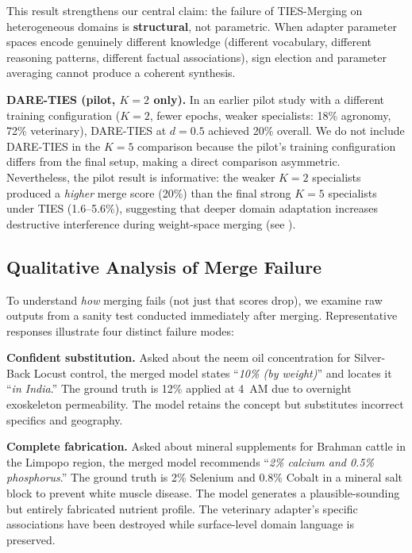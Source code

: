 \documentclass[conference, 10pt]{IEEEtran}
\begin{document}
This result strengthens our central claim: the failure of TIES-Merging
on heterogeneous domains is \textbf{structural}, not parametric.
When adapter parameter spaces encode genuinely different knowledge
(different vocabulary, different reasoning patterns, different factual
associations), sign election and parameter averaging cannot produce a
coherent synthesis.

\textbf{DARE-TIES (pilot, $K=2$ only).}
In an earlier pilot study with a different training configuration
($K=2$, fewer epochs, weaker specialists: 18\% agronomy, 72\%
veterinary), DARE-TIES at $d = 0.5$ achieved 20\% overall.
We do not include DARE-TIES in the $K=5$ comparison because the
pilot's training configuration differs from the final setup,
making a direct comparison asymmetric.
Nevertheless, the pilot result is informative: the weaker $K=2$
specialists produced a \emph{higher} merge score (20\%) than the
final strong $K=5$ specialists under TIES (1.6--5.6\%),
suggesting that deeper domain adaptation increases destructive
interference during weight-space merging (see ).

\subsection{Qualitative Analysis of Merge Failure}
\label{sec:qualitative}

To understand \emph{how} merging fails (not just that scores
drop), we examine raw outputs from a sanity test conducted
immediately after merging.
Representative responses illustrate four distinct failure modes:

\textbf{Confident substitution.}
Asked about the neem oil concentration for Silver-Back Locust control,
the merged model states ``\emph{10\% (by weight)}'' and locates it
``\emph{in India}.''
The ground truth is 12\% applied at 4~AM due to overnight exoskeleton
permeability. The model retains the concept but substitutes incorrect
specifics and geography.

\textbf{Complete fabrication.}
Asked about mineral supplements for Brahman cattle in the Limpopo
region, the merged model recommends ``\emph{2\% calcium and 0.5\%
phosphorus}.''
The ground truth is 2\% Selenium and 0.8\% Cobalt in a mineral salt
block to prevent white muscle disease.
The model generates a plausible-sounding but entirely fabricated
nutrient profile. The veterinary adapter's specific associations
have been destroyed while surface-level domain language is preserved.
\end{document}
